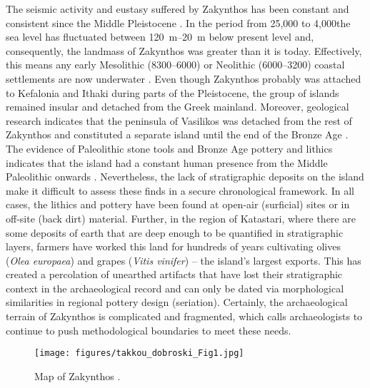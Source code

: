 The seismic activity and eustasy suffered by Zakynthos has been constant and consistent since the Middle Pleistocene \parencite[400]{Zelilidis_1998}. In the period from 25,000 to 4,000\BC the sea level has fluctuated between \SIrange[range-phrase=--]{120}{20}{\metre} below present level and, consequently, the landmass of Zakynthos was greater than it is today. Effectively, this means any early Mesolithic (8300--6000\BC) or Neolithic (6000--3200\BC) coastal settlements are now underwater \parencite[2172]{Ferentinos_2012}. Even though Zakynthos probably was attached to Kefalonia and Ithaki during parts of the Pleistocene, the group of islands remained insular and detached from the Greek mainland. Moreover, geological research indicates that the peninsula of Vasilikos was detached from the rest of Zakynthos and constituted a separate island until the end of the Bronze Age \parencite{Lambeck_2005}. The evidence of Paleolithic stone tools and Bronze Age pottery and lithics indicates that the island had a constant human presence from the Middle Paleolithic onwards \parencite[286]{Kourtessi-Philippakis_1999}. Nevertheless, the lack of stratigraphic deposits on the island make it difficult to assess these finds in a secure chronological framework. In all cases, the lithics and pottery have been found at open-air (surficial) sites or in off-site (back dirt) material. Further, in the region of Katastari, where there are some deposits of earth that are deep enough to be quantified in stratigraphic layers, farmers have worked this land for hundreds of years cultivating olives (\textit{Olea europaea}) and grapes (\textit{Vitis vinifer}) – the island’s largest exports. This has created a percolation of unearthed artifacts that have lost their stratigraphic context in the archaeological record and can only be dated via morphological similarities in regional pottery design (seriation). Certainly, the archaeological terrain of Zakynthos is complicated and fragmented, which calls archaeologists to continue to push methodological boundaries to meet these needs.
	
		\begin{figure}[!bt]
			\texttt{[image: figures/takkou\_dobroski\_Fig1.jpg]}
			\caption{Map of Zakynthos \parencite[128]{VanWijngaarden_2013}.}
			\label{fig:Takkou_Fig1}
		\end{figure}
		
	

